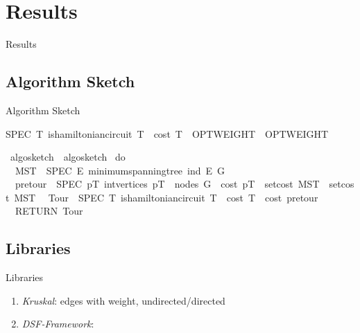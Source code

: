 \documentclass[%
	sans,
	12pt,
]{beamer}
\newcommand{\high}[1]{{\usebeamercolor[fg]{structure} #1}}
\def\isacartoucheopen{}%
\def\isacartoucheclose{}%
\begin{document}
\section{Results}
\begin{frame}
\huge\high{Results}
\end{frame}

\subsection{Algorithm Sketch}
\begin{frame}{Algorithm Sketch}
\begin{isabelle}
	SPEC\ {\isacharparenleft}{\isasymlambda}T{\isachardot}\ is{\isacharunderscore}hamiltonian{\isacharunderscore}circuit\ T\ {\isasymand}\ cost\ T\ {\isasymle}\ OPTWEIGHT\ {\isacharplus}\ OPTWEIGHT{\isacharparenright}{\isacartoucheclose}
\end{isabelle}
\begin{isabelle}
	\isamarkupfalse%
	\ algo{\isacharunderscore}sketch\ \ {\isacartoucheopen}algo{\isacharunderscore}sketch\ {\isacharequal}\isanewline
	do\ {\isacharbraceleft}\isanewline
	\ \ MST\ {\isasymleftarrow}\ SPEC\ {\isacharparenleft}{\isasymlambda}E{\isacharprime}{\isachardot}\ minimum{\isacharunderscore}spanning{\isacharunderscore}tree\ {\isacharparenleft}ind\ E{\isacharprime}{\isacharparenright}\ {\isacharparenleft}G\ %
	\isanewline
	\ \ pretour\ {\isasymleftarrow}\ SPEC\ {\isacharparenleft}{\isasymlambda}pT{\isachardot}\ int{\isacharunderscore}vertices\ pT\ {\isacharequal}\ nodes\ G\ {\isasymand}\ cost\ pT\ {\isasymle}\ set{\isacharunderscore}cost\ MST\ {\isacharplus}\ set{\isacharunderscore}cost\ MST{\isacharparenright}{\isacharsemicolon}\isanewline
	\ \ Tour\ {\isasymleftarrow}\ SPEC\ {\isacharparenleft}{\isasymlambda}T{\isachardot}\ is{\isacharunderscore}hamiltonian{\isacharunderscore}circuit\ T\ {\isasymand}\ cost\ T\ {\isasymle}\ cost\ pretour{\isacharparenright}{\isacharsemicolon}\isanewline
	\ \ RETURN\ Tour\isanewline
	{\isacharbraceright}{\isacartoucheclose}
\end{isabelle}
\end{frame}

\subsection{Libraries}
\begin{frame}{Libraries}
\begin{enumerate}
	\item \textit{Kruskal}: edges with weight, undirected/directed
	\item \textit{DSF-Framework}:
\end{enumerate}
\end{frame}
\end{document}
